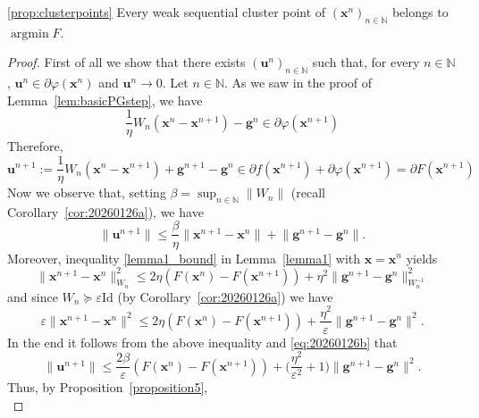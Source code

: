 \documentclass[11pt]{article}
\theoremstyle{plain}
\theoremstyle{definition}
\theoremstyle{remark}
\newcommand{\norm}[1]{\lVert{#1}\rVert}
\DeclareMathOperator*{\argmin}{argmin}
\newcommand{\bx}{\bm{x}}
\newcommand{\buu}{\bm{g}}
\newcommand{\iter}{n}
\newcommand{\N}{\mathbb{N}}
\newcommand{\reg}{\varphi}
\newcommand{\Id}{\mathrm{Id}}
\newcommand{\W}{W}
\begin{document}
\begin{customprop}{\ref{prop:clusterpoints}}
Every weak sequential cluster point of $(\bx^{\iter})_{\iter\in \N}$ belongs to $\argmin F$.
\end{customprop}
\begin{proof}
First of all we show that there exists $(\bm{u}^{\iter})_{\iter\in \N}$ such that, for every $n\in \N$, $\bm{u}^\iter\in \partial \reg(\bx^\iter)$ and
 $\bm{u}^\iter\to 0$.
Let $\iter\in \N$.
As we saw in the proof of Lemma~\ref{lem:basicPGstep}, we have
\begin{equation*}
\frac{1}{\eta}\W_\iter(\bx^{\iter}-\bx^{\iter+1})- \buu^\iter\in \partial \reg(\bx^{\iter+1})
\end{equation*}
Therefore,
\begin{equation*}
\bm{u}^{\iter+1}:= \frac{1}{\eta}\W_\iter(\bx^{\iter}-\bx^{\iter+1}) + \buu^{\iter+1} - \buu^\iter \in \partial f(\bx^{\iter+1})+\partial \varphi(\bx^{\iter+1}) = \partial F(\bx^{\iter+1})
\end{equation*}
Now we observe that, setting $\beta= \sup_{\iter\in \N}\norm{\W_\iter}$ (recall Corollary~\ref{cor:20260126a}), we have
\begin{equation}
\label{eq:20260126b}
\norm{\bm{u}^{\iter+1}} \leq \frac{\beta}{\eta}\norm{\bx^{\iter+1}-\bx^\iter} + \norm{\buu^{\iter+1} - \buu^\iter}.
\end{equation}
Moreover, inequality \eqref{lemma1_bound} in Lemma~\ref{lemma1} with $\bx= \bx^\iter$ yields
\begin{equation*}
 \norm{\bx^{\iter+1} - \bx^\iter}_{\W_\iter}^2\leq 
2\eta(F(\bx^\iter)- F(\bx^{\iter+1}))  
+ \eta^2 \norm{\buu^{\iter+1} - \buu^{\iter}}_{\W_\iter^{-1}}^2
\end{equation*}
and since $\W_\iter \succeq \varepsilon \Id$ (by Corollary~\ref{cor:20260126a}) we have
\begin{equation*}
 \varepsilon \norm{\bx^{\iter+1} - \bx^\iter}^2\leq 
2\eta(F(\bx^\iter)- F(\bx^{\iter+1}))  
+ \frac{\eta^2}{\varepsilon} \norm{\buu^{\iter+1} - \buu^{\iter}}^2.
\end{equation*}
 In the end it follows from the above inequality and \eqref{eq:20260126b} that
 \begin{equation*}
 \norm{\bm{u}^{\iter+1}} \leq \frac{2\beta}{\varepsilon} (F(\bx^\iter)- F(\bx^{\iter+1}))  +
\bigg( \frac{\eta^2}{\varepsilon^2} + 1\bigg)
\norm{\buu^{\iter+1} - \buu^{\iter}}^2. 
 \end{equation*}
Thus, by Proposition~\ref{proposition5},
 \begin{equation*}

\end{equation*}
\end{proof}
\end{document}
